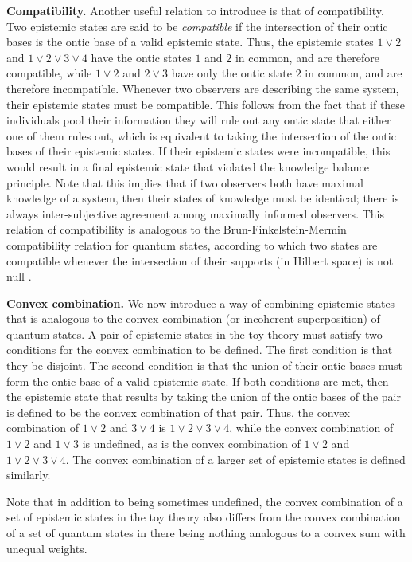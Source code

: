 \documentclass[pra,twocolumn,nofootinbib,showpacs]{revtex4}
\begin{document}
\textbf{Compatibility.} Another useful relation to introduce is that of
compatibility. Two epistemic states are said to be \emph{compatible} if the
intersection of their ontic bases is the ontic base of a valid epistemic
state. Thus, the epistemic states $1\vee 2$ and $1\vee 2\vee 3\vee 4$ have
the ontic states $1$ and $2$ in common, and are therefore compatible, while $%
1\vee 2$ and $2\vee 3$ have only the ontic state $2$ in common, and are
therefore incompatible. Whenever two observers are describing the same
system, their epistemic states must be compatible. This follows from the
fact that if these individuals pool their information they will rule out any
ontic state that either one of them rules out, which is equivalent to taking
the intersection of the ontic bases of their epistemic states. If their
epistemic states were incompatible, this would result in a final epistemic
state that violated the knowledge balance principle. Note that this implies
that if two observers both have maximal knowledge of a system, then their
states of knowledge must be identical; there is always inter-subjective
agreement among maximally informed observers. This relation of compatibility
is analogous to the Brun-Finkelstein-Mermin compatibility relation for
quantum states, according to which two states are compatible whenever the
intersection of their supports (in Hilbert space) is not null \cite{BFM}.

\textbf{Convex combination.} We now introduce a way of combining epistemic
states that is analogous to the convex combination (or incoherent
superposition) of quantum states. A pair of epistemic states in the toy
theory must satisfy two conditions for the convex combination to be defined.
The first condition is that they be disjoint. The second condition is that
the union of their ontic bases must form the ontic base of a valid epistemic
state. If both conditions are met, then the epistemic state that results by
taking the union of the ontic bases of the pair is defined to be the convex
combination of that pair. Thus, the convex combination of $1\vee 2$ and $%
3\vee 4$ is $1\vee 2\vee 3\vee 4$, while the convex combination of $1\vee 2$
and $1\vee 3$ is undefined, as is the convex combination of $1\vee 2$ and $%
1\vee 2\vee 3\vee 4$. The convex combination of a larger set of epistemic
states is defined similarly.

Note that in addition to being sometimes undefined, the convex combination
of a set of epistemic states in the toy theory also differs from the convex
combination of a set of quantum states in there being nothing analogous to a
convex sum with unequal weights.
\end{document}
